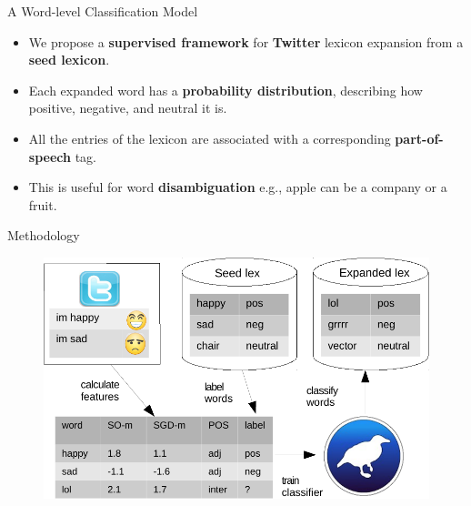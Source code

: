 \documentclass[handout]{beamer}
\begin{document}
\begin{frame}{A Word-level Classification Model}
\begin{scriptsize}
\begin{itemize}

\item We propose a \textbf{supervised framework} for \textbf{Twitter} lexicon expansion from a \textbf{seed lexicon}.
\item Each expanded word has a \textbf{probability distribution}, describing how positive, negative, and neutral it is.
\item All the entries of the lexicon are associated with a corresponding \textbf{part-of-speech} tag.
\item This is useful for word \textbf{disambiguation} e.g., apple can be a company or a fruit.
\end{itemize}
\end{scriptsize}

\end{frame}


\begin{frame}{Methodology}

\begin{figure}[htb]
	\centering
	 \includegraphics[scale=0.8]{diagram_crop.pdf}
	\label{fig:sosgd}
\end{figure}


\end{frame}
\end{document}
